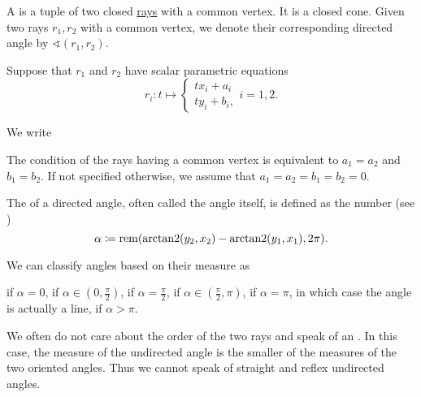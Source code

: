 \begin{definition}\label{def:angle}
  A  is a tuple of two closed \hyperref[def:geometric_ray]{rays} with a common vertex. It is a closed cone. Given two rays \( r_1, r_2 \) with a common vertex, we denote their corresponding directed angle by \( \sphericalangle(r_1, r_2) \).

  Suppose that \( r_1 \) and \( r_2 \) have scalar parametric equations
  \begin{equation*}
    r_i: t \mapsto
    \begin{cases}
      tx_i + a_i \\
      ty_i + b_i,
    \end{cases}
    i = 1, 2.
  \end{equation*}

  We write

  The condition of the rays having a common vertex is equivalent to \( a_1 = a_2 \) and \( b_1 = b_2 \). If not specified otherwise, we assume that \( a_1 = a_2 = b_1 = b_2 = 0 \).

  The  of a directed angle, often called the angle itself, is defined as the number (see )
  \begin{equation*}
    \alpha \coloneqq \operatorname{rem}(\operatorname{arctan2}(y_2, x_2) - \operatorname{arctan2}(y_1, x_1), 2\pi).
  \end{equation*}

  We can classify angles based on their measure as
  \begin{DefEnum}
      if \( \alpha = 0 \),
      if \( \alpha \in (0, \tfrac \pi 2) \),
      if \( \alpha = \tfrac \pi 2 \),
      if \( \alpha \in (\tfrac \pi 2, \pi) \),
      if \( \alpha = \pi \), in which case the angle is actually a line,
      if \( \alpha > \pi \).
  \end{DefEnum}

  We often do not care about the order of the two rays and speak of an . In this case, the measure of the undirected angle is the smaller of the measures of the two oriented angles. Thus we cannot speak of straight and reflex undirected angles.
\end{definition}

